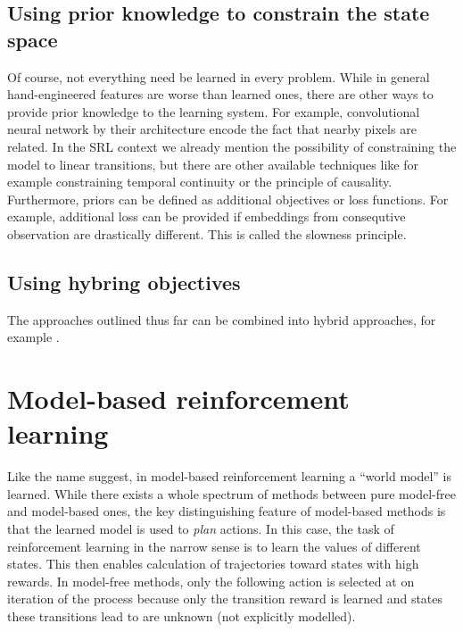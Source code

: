 \subsection{Using prior knowledge to constrain the state space}
Of course, not everything need be learned in every problem.
While in general hand-engineered features are worse than learned ones,
there are other ways to provide prior knowledge to the learning system.
For example, convolutional neural network by their architecture encode
the fact that nearby pixels are related.
In the SRL context we already mention the possibility of constraining 
the model to linear transitions, but there are other available techniques
like for example
constraining temporal continuity or the principle of causality.
Furthermore, priors can be defined as additional objectives or loss functions.
For example, additional loss can be provided if embeddings from
consequtive observation are drastically different.
This is called the slowness principle.

\subsection{Using hybring objectives}
The approaches outlined thus far can be combined into hybrid
approaches, for example \cite{watter2015embed}.


\section{Model-based reinforcement learning}
Like the name suggest, in model-based reinforcement learning a ``world model''
is learned.
While there exists a whole spectrum of methods between pure
model-free and model-based ones, the key distinguishing feature
of model-based methods is that the learned model is used to \textit{plan} actions.
In this case, the task of reinforcement learning in the narrow sense
is to learn the values of different states.
This then enables calculation of trajectories toward states with high rewards.
In model-free methods, only the following action is selected at on iteration of the process
because only the transition reward is learned and states these transitions
lead to are unknown (not explicitly modelled).


